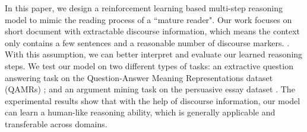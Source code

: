 In this paper, we design a reinforcement learning based multi-step reasoning model to mimic the reading process of a ``mature reader". Our work focuses on short document with extractable discourse information, which means the context only contains a few sentences and a reasonable number of discourse markers. . With this assumption, we can better interpret and evaluate our learned reasoning steps. %
We test our model on two different types of tasks: an extractive question answering task on the Question-Answer Meaning Representations dataset (QAMRs) \cite{DBLP:conf/naacl/MichaelSHDZ18}; and an argument mining task \cite{DBLP:conf/lrec/ReedPRM08}  on the persuasive essay dataset \cite{DBLP:conf/coling/StabG14}. The experimental results show that with the help of discourse information, our model can learn a human-like reasoning ability, which is generally applicable and transferable across domains.
